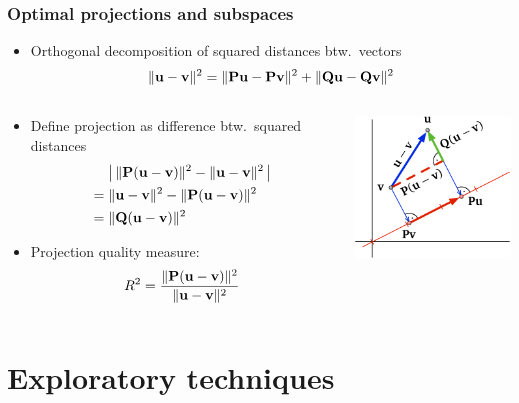 \documentclass[t]{beamer} %
\begin{document}
\begin{frame}
  \frametitle{Optimal projections and subspaces}

  \begin{itemize}
  \item Orthogonal decomposition of squared distances btw.\ vectors
    \[
      \norm{\vu - \vv}^2 = \norm{\mathbf{P} \vu - \mathbf{P} \vv}^2 + \norm{\mathbf{Q} \vu - \mathbf{Q} \vv}^2
    \]
  \end{itemize}

  \begin{columns}[c]
    \begin{column}{60mm}
      \begin{itemize}
      \item<2-> Define projection  as difference btw.\ squared distances
        \begin{align*}
          & \bigabs{\,\norm{\mathbf{P}(\vu - \vv)}^2 - \norm{\vu - \vv}^2\,} \\
          =\;& \norm{\vu - \vv}^2 - \norm{\mathbf{P}(\vu - \vv)}^2 \\
          =\;& \norm{\mathbf{Q}(\vu - \vv)}^2
        \end{align*}
      \item<3-> Projection quality measure:
        \[
          R^2 = \frac{\norm{\mathbf{P}(\vu - \vv)}^2}{\norm{\vu - \vv}^2}
        \]
      \end{itemize}
    \end{column}
    \begin{column}{40mm}
      \hspace*{-5mm}%
      \includegraphics[width=45mm]{img/7_projection_loss}      
    \end{column}
  \end{columns}
\end{frame}

\section{Exploratory techniques}
\end{document}
